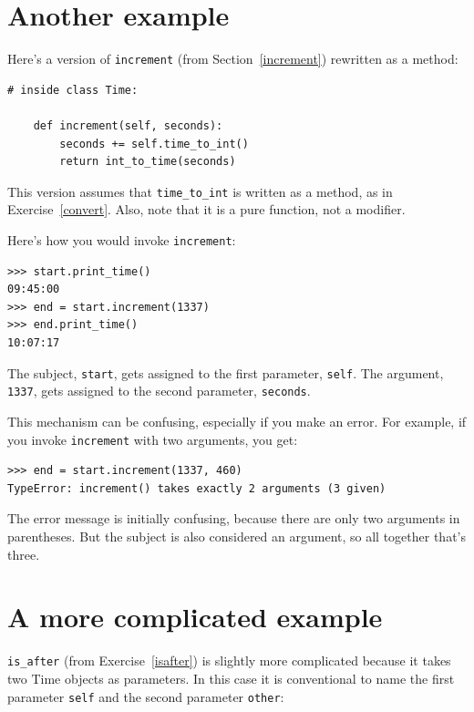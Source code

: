 \documentclass[10pt]{book}
\begin{document}
\begin{CJK}{UTF8}{gbsn}
\begin{exercise}
\end{exercise}


\section{Another example}

Here's a version of {\tt increment} (from Section~\ref{increment})
rewritten as a method:

\begin{verbatim}
# inside class Time:

    def increment(self, seconds):
        seconds += self.time_to_int()
        return int_to_time(seconds)
\end{verbatim}
%
This version assumes that \verb"time_to_int" is written
as a method, as in Exercise~\ref{convert}.  Also, note that
it is a pure function, not a modifier.

Here's how you would invoke {\tt increment}:

\begin{verbatim}
>>> start.print_time()
09:45:00
>>> end = start.increment(1337)
>>> end.print_time()
10:07:17
\end{verbatim}
%
The subject, {\tt start}, gets assigned to the first parameter,
{\tt self}.  The argument, {\tt 1337}, gets assigned to the
second parameter, {\tt seconds}.

This mechanism can be confusing, especially if you make an error.
For example, if you invoke {\tt increment} with two arguments, you
get:

\begin{verbatim}
>>> end = start.increment(1337, 460)
TypeError: increment() takes exactly 2 arguments (3 given)
\end{verbatim}
%
The error message is initially confusing, because there are
only two arguments in parentheses.  But the subject is also
considered an argument, so all together that's three.


\section{A more complicated example}

\verb"is_after" (from Exercise~\ref{isafter}) is slightly more complicated
because it takes two Time objects as parameters.  In this case it is
conventional to name the first parameter {\tt self} and the second
parameter {\tt other}:


\end{CJK}
\end{document}
